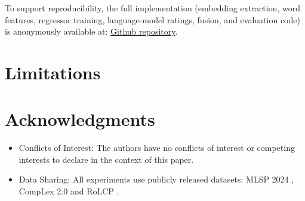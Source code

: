 \noindent To support reproducibility, the full implementation (embedding extraction, word features, regressor training, language-model ratings, fusion, and evaluation code) is anonymously available at: \href{https://anonymous.4open.science/r/zero-label-lcp}{Github repository}.

\section*{Limitations}

\section*{Acknowledgments}

\begin{itemize}
\item Conflicts of Interest: The authors have no conflicts of interest or competing interests to
declare in the context of this paper.
\item Data Sharing: All experiments use publicly released datasets: MLSP 2024
\citep{shardlow-etal-2024-bea}, CompLex 2.0 \citep{shardlow-etal-2021-semeval} and RoLCP
\citep{anghel-etal-2025-rals}.
\end{itemize}

\nocite{*}

%



\appendix



